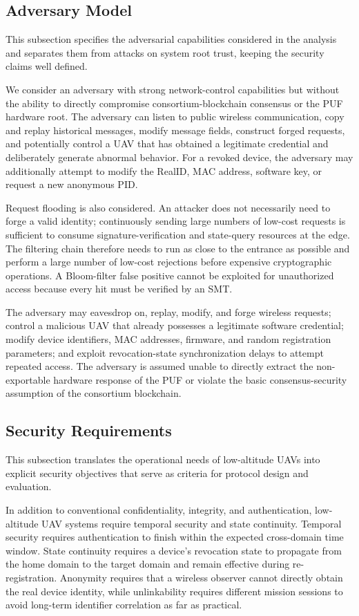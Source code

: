 \documentclass[lettersize,journal]{IEEEtran}
\begin{document}
	\subsection{Adversary Model}
	This subsection specifies the adversarial capabilities considered in the analysis and separates them from attacks on system root trust, keeping the security claims well defined.
	
	
	We consider an adversary with strong network-control capabilities but without the ability to directly compromise consortium-blockchain consensus or the PUF hardware root. The adversary can listen to public wireless communication, copy and replay historical messages, modify message fields, construct forged requests, and potentially control a UAV that has obtained a legitimate credential and deliberately generate abnormal behavior. For a revoked device, the adversary may additionally attempt to modify the RealID, MAC address, software key, or request a new anonymous PID.
	
	Request flooding is also considered. An attacker does not necessarily need to forge a valid identity; continuously sending large numbers of low-cost requests is sufficient to consume signature-verification and state-query resources at the edge. The filtering chain therefore needs to run as close to the entrance as possible and perform a large number of low-cost rejections before expensive cryptographic operations. A Bloom-filter false positive cannot be exploited for unauthorized access because every hit must be verified by an SMT.
	
	The adversary may eavesdrop on, replay, modify, and forge wireless requests; control a malicious UAV that already possesses a legitimate software credential; modify device identifiers, MAC addresses, firmware, and random registration parameters; and exploit revocation-state synchronization delays to attempt repeated access. The adversary is assumed unable to directly extract the non-exportable hardware response of the PUF or violate the basic consensus-security assumption of the consortium blockchain.
	
	\subsection{Security Requirements}
	This subsection translates the operational needs of low-altitude UAVs into explicit security objectives that serve as criteria for protocol design and evaluation.
	
	
	In addition to conventional confidentiality, integrity, and authentication, low-altitude UAV systems require temporal security and state continuity. Temporal security requires authentication to finish within the expected cross-domain time window. State continuity requires a device's revocation state to propagate from the home domain to the target domain and remain effective during re-registration. Anonymity requires that a wireless observer cannot directly obtain the real device identity, while unlinkability requires different mission sessions to avoid long-term identifier correlation as far as practical.
	
\end{document}
